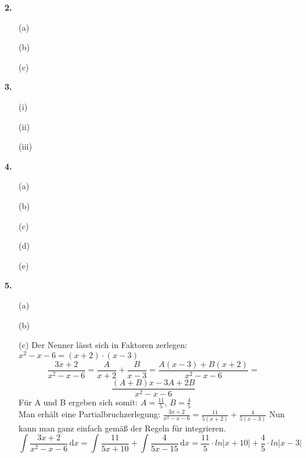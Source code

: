 \documentclass[a4paper,11pt,fleqn]{scrartcl}
\newcommand{\dX}[1]{\, \mathrm{d}#1}
\newcommand{\dx}[0]{\dX{x}}
\begin{document}
\begin{enumerate}
\begin{enumerate}
            \item[(ii)]
            \item[(iii)]
        \end{enumerate}
    \item[\textbf{2.}]
        \begin{enumerate}
            \item[(a)]
            \item[(b)]
            \item[(c)]
        \end{enumerate}
    \item[\textbf{3.}]
        \begin{enumerate}
            \item[(i)]
            \item[(ii)]
            \item[(iii)]
        \end{enumerate}
    \item[\textbf{4.}]
        \begin{enumerate}
            \item[(a)]
            \item[(b)]
            \item[(c)]
            \item[(d)]
            \item[(e)]
        \end{enumerate}
    \item[\textbf{5.}]
        \begin{enumerate}
            \item[(a)]
            \item[(b)]
            \item[(c)]
                Der Nenner lässt sich in Faktoren zerlegen: \(x^2-x-6 = (x+2)\cdot(x-3)\)
                \[ \frac{3x+2}{x^2-x-6} = \frac{A}{x+2} + \frac{B}{x-3} = \frac{A(x-3)+B(x+2)}{x^2-x-6} =\]
                \[ \frac{(A+B)x -3A + 2B}{x^2-x-6}\]
                Für A und B ergeben sich somit: $A=\frac{11}{5}$, $B=\frac{4}{5}$ \\
                Man erhält eine Partialbruchzerlegung: \( \frac{3x+2}{x^2-x-6} = \frac{11}{5(x+2)} + \frac{4}{5(x-3)} \)
                Nun kann man ganz einfach gemäß der Regeln für integrieren. \\
                \[ \int \frac{3x+2}{x^2-x-6} \dx = \int \frac{11}{5x+10} + \int \frac{4}{5x-15} \dx = \frac{11}{5} \cdot ln|x+10| + \frac{4}{5} \cdot ln|x-3| \]


\end{enumerate}
\end{enumerate}
\end{document}
